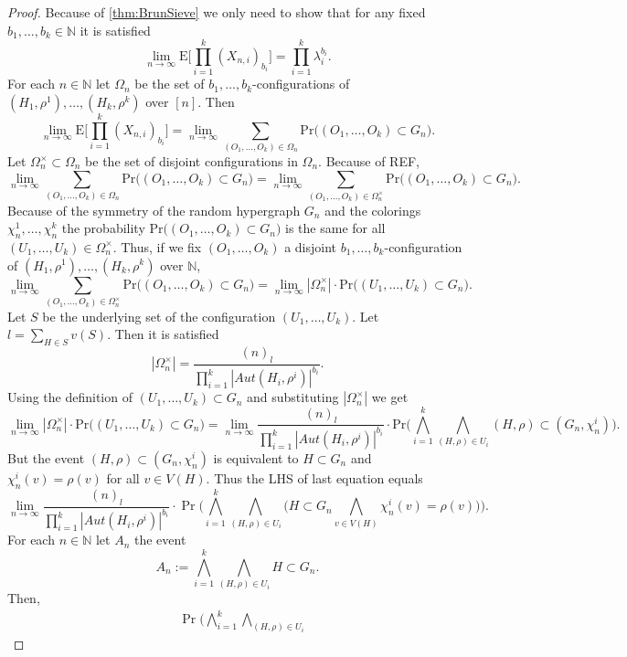 \documentclass[12pt,notitlepage,a4paper]{article}
\theoremstyle{definition}
\newcommand{\N}{\mathbb{N}}
\newcommand{\Ln}{\lim\limits_{n\to \infty}}
\newcommand{\PR}[1]{\mathrm{Pr}\big(#1\big)}
\begin{document}
\begin{proof}
	Because of \cref{thm:BrunSieve} we only need to show that for any 
	fixed $b_1,\dots, b_k\in \N$ it is satisfied
	\[
	\Ln \mathrm{E}\big[ \prod_{i=1}^{k} (X_{n,i})_{b_i} \big]=
	\prod_{i=1}^{k} \lambda_i^{b_i}.		
	\]
	For each $n\in \N$ let $\Omega_n$ be the set
	of $b_1, \dots, b_k$-configurations of $(H_1,\rho^1)
	,\dots, (H_k, \rho^k)$ over $[n]$. Then
	\[
	\Ln \mathrm{E}\big[ \prod_{i=1}^{k} (X_{n,i})_{b_i} \big]=
	\Ln \sum_{(O_1,\dots, O_k)\in \Omega_n}
	\mathrm{Pr}
	\big(
	(O_1,\dots, O_k) \subset G_n
	\big).	
	\]
	Let $\Omega^{\times}_n\subset \Omega_n$ be the set of 
	disjoint configurations in $\Omega_n$. Because of REF,
	\[
	\Ln \sum_{(O_1,\dots, O_k)\in \Omega_n}
	\mathrm{Pr}
	\big(
	(O_1,\dots, O_k) \subset G_n
	\big)=
	\Ln \sum_{(O_1,\dots, O_k)\in \Omega^\times_n}
	\mathrm{Pr}\big(
	(O_1,\dots, O_k) \subset G_n
	\big).
	\]
	Because of the symmetry of the random hypergraph $G_n$ and
	the colorings $\chi^1_n, \dots, \chi^k_n$ the probability
	$\mathrm{Pr}\big(
	(O_1,\dots, O_k) \subset G_n
	\big)$ is the same for all $(U_1,\dots, U_k)\in 
	\Omega^\times_n$. Thus, if we fix
	$(O_1, \dots, O_k)$ a 
	disjoint $b_1,\dots,b_k$-configuration of
	 $(H_1,\rho^1)
	,\dots, (H_k, \rho^k)$ over $\N$, 
	\[
	\Ln \sum_{(O_1,\dots, O_k)\in \Omega^\times_n}
	\mathrm{Pr}\big(
	(O_1,\dots, O_k) \subset G_n
	\big) =
	\Ln |\Omega^{\times}_n|\cdot \mathrm{Pr}\big(
	(U_1,\dots, U_k) \subset G_n
	\big).
	\]
	Let $S$ be the underlying set of the configuration $(U_1,\dots,U_k)$.
	Let $l= \sum_{H\in S} v(S)$. Then it is satisfied 
	\[
	|\Omega^{\times}_n|= \frac{(n)_l}{\prod_{i=1}^k |Aut(H_i,\rho^i)|^{b_i}}.
	\]
	Using the definition of $(U_1,\dots, U_k) \subset G_n$ and
	substituting $|\Omega^{\times}_n|$ we get
	\[
	\Ln |\Omega^{\times}_n|\cdot \mathrm{Pr}\big(
	(U_1,\dots, U_k) \subset G_n
	\big) = \Ln
	\frac{(n)_l}{\prod_{i=1}^k |Aut(H_i,\rho^i)|^{b_i}}\cdot
	\PR{\bigwedge_{i=1}^k \bigwedge_{(H,\rho)\in U_i} 
	(H,\rho)\subset (G_n, \chi_n^i)}.
	\]
	But the event $(H,\rho)\subset (G_n, \chi_n^i)$ is equivalent to $H\subset G_n$ and
	$\chi_n^i(v)=\rho(v)$ for all $v\in V(H)$. Thus the LHS of last equation equals
	\[
	\Ln
	\frac{(n)_l}{\prod_{i=1}^k |Aut(H_i,\rho^i)|^{b_i}}\cdot
	\Pr\Big(\bigwedge_{i=1}^k \bigwedge_{(H,\rho)\in U_i} 
	\big(H\subset G_n \bigwedge_{v\in V(H)} \chi_n^i(v)=\rho(v) \big) \Big).
	\]
	For each $n\in \N$ let $A_n$ the event
	\[
	A_n:=\bigwedge_{i=1}^k \bigwedge_{(H,\rho)\in U_i} 
	H\subset G_n.
	\]	
	Then,
	\begin{align*}
	&\Pr\Big(\bigwedge_{i=1}^k \bigwedge_{(H,\rho)\in U_i} 

\end{align*}
\end{proof}
\end{document}
